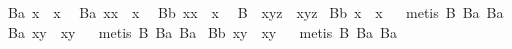 \begin{isabellebody}
\ B{}a{\isacharcolon}\ {\isachardoublequoteopen}{\isacharparenleft}{\isacharparenleft}{\isasymbox}x{\isacharparenright}{\isasymbox}{\isacharparenright}\ {\isasymapprox}\ {\isasymbox}x{\isachardoublequoteclose}\ \isanewline
\ B{}a{\isacharcolon}\ {\isachardoublequoteopen}{\isacharparenleft}{\isasymbox}x{\isacharparenright}{\isasymcdot}x\ {\isasymapprox}\ x{\isachardoublequoteclose}\ \isanewline
\ B{}b{\isacharcolon}\ {\isachardoublequoteopen}x{\isasymcdot}{\isacharparenleft}x{\isasymbox}{\isacharparenright}\ {\isasymapprox}\ x{\isachardoublequoteclose}\ \isanewline
\ B{}{\isacharcolon}\ \ {\isachardoublequoteopen}x{\isasymcdot}{\isacharparenleft}y{\isasymcdot}z{\isacharparenright}\ {\isasymapprox}\ {\isacharparenleft}x{\isasymcdot}y{\isacharparenright}{\isasymcdot}z{\isachardoublequoteclose}\isanewline
\isanewline
{}\isamarkupfalse%
\ B{}b{\isacharcolon}\ {\isachardoublequoteopen}{\isasymbox}{\isacharparenleft}x{\isasymbox}{\isacharparenright}\ {\isasymapprox}\ {\isasymbox}x{\isachardoublequoteclose}%
\isadelimproof
\ %
\endisadelimproof
%
\isatagproof
{}\isamarkupfalse%
\ {\isacharparenleft}metis\ B{}\ B{}a\ B{}a{\isacharparenright}%
\endisatagproof
{\isafoldproof}%
%
\isadelimproof
%
\endisadelimproof
\isanewline
{}\isamarkupfalse%
\ B{}a{\isacharcolon}\ {\isachardoublequoteopen}{\isasymbox}{\isacharparenleft}x{\isasymcdot}y{\isacharparenright}\ {\isasymapprox}\ {\isasymbox}{\isacharparenleft}x{\isasymcdot}{\isacharparenleft}{\isasymbox}y{\isacharparenright}{\isacharparenright}{\isachardoublequoteclose}%
\isadelimproof
\ %
\endisadelimproof
%
\isatagproof
{}\isamarkupfalse%
\ {\isacharparenleft}metis\ B{}\ B{}a\ B{}a{\isacharparenright}%
\endisatagproof
{\isafoldproof}%
%
\isadelimproof
%
\endisadelimproof
\isanewline
{}\isamarkupfalse%
\ B{}b{\isacharcolon}\ {\isachardoublequoteopen}{\isacharparenleft}x{\isasymcdot}y{\isacharparenright}{\isasymbox}\ {\isasymapprox}\ {\isacharparenleft}{\isacharparenleft}x{\isasymbox}{\isacharparenright}{\isasymcdot}y{\isacharparenright}{\isasymbox}{\isachardoublequoteclose}%
\isadelimproof
\ %
\endisadelimproof
%
\isatagproof
{}\isamarkupfalse%
\ {\isacharparenleft}metis\ B{}\ B{}a\ B{}a{\isacharparenright}%
\endisatagproof
{\isafoldproof}%
%
\isadelimproof
%
\endisadelimproof
%
\begin{isamarkuptext}%

\end{isamarkuptext}
\end{isabellebody}
